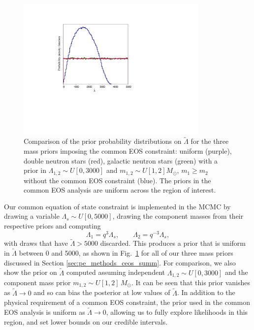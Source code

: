 \begin{figure}[t]
\centering
\includegraphics[width=\textwidth,height=7cm,width=8.5cm]{figures/common_eos/prior_lambdatilde.pdf}
\caption{Comparison of the prior probability distributions on $\tilde\Lambda$ for the three mass priors imposing the common EOS constraint: uniform (purple), double neutron stars (red), galactic neutron stars (green) with a prior in $\Lambda_{1,2} \sim U[0, 3000]$ and $m_{1,2} \sim U[1, 2] M_\odot$, $m_1 \geq m_2$ without the common EOS constraint (blue). The priors in the common EOS analysis are uniform across the region of interest.} 
\label{fig:lambda_priors}
\end{figure}


Our common equation of state constraint is implemented in the MCMC by drawing a variable $\Lambda_s \sim U[0,5000]$, drawing the component masses from their respective priors and computing
\begin{equation}
\Lambda_1=q^3\Lambda_s,\qquad\Lambda_2=q^{-3}\Lambda_s,
\label{eq:lambdas_supp}\end{equation}
with draws that have $\tilde\Lambda > 5000$ discarded. This produces a prior that is uniform in $\tilde\Lambda$ between 0 and 5000, as shown in Fig.~\ref{fig:lambda_priors} for all of our three mass priors discussed in Section \ref{sec:pe_methods_ceos_summ}. For comparison, we also show the prior on $\tilde\Lambda$ computed assuming independent $\Lambda_{1,2} \sim U[0,3000]$ and the component mass prior $m_{1,2}\sim U[1,2]\,M_\odot$. It can be seen that this prior vanishes as $\tilde\Lambda \rightarrow 0$ and so can bias the posterior at low values of   $\tilde\Lambda$. In addition to the physical requirement of a common EOS constraint, the prior used in the common EOS analysis is uniform as $\tilde\Lambda \rightarrow 0$, allowing us to fully explore likelihoods in this region, and set lower bounds on our credible intervals.

